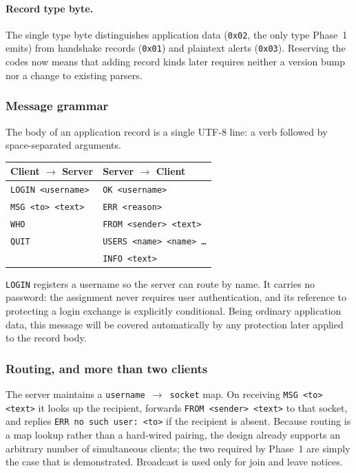 \documentclass[11pt,a4paper]{article}
\begin{document}
\paragraph{Record type byte.} The single type byte distinguishes application data (\texttt{0x02},
the only type Phase~1 emits) from handshake records (\texttt{0x01}) and plaintext alerts
(\texttt{0x03}). Reserving the codes now means that adding record kinds later requires neither a
version bump nor a change to existing parsers.

\subsubsection{Message grammar}

The body of an application record is a single UTF-8 line: a verb followed by space-separated
arguments.

\begin{center}
\small
\begin{tabular}{@{}ll@{}}
\toprule
\textbf{Client $\rightarrow$ Server} & \textbf{Server $\rightarrow$ Client} \\
\midrule
\texttt{LOGIN <username>} & \texttt{OK <username>} \\
\texttt{MSG <to> <text>}  & \texttt{ERR <reason>} \\
\texttt{WHO}              & \texttt{FROM <sender> <text>} \\
\texttt{QUIT}             & \texttt{USERS <name> <name> \dots} \\
                          & \texttt{INFO <text>} \\
\bottomrule
\end{tabular}
\end{center}

\texttt{LOGIN} registers a username so the server can route by name. It carries no password: the
assignment never requires user authentication, and its reference to protecting a login exchange is
explicitly conditional. Being ordinary application data, this message will be covered automatically by
any protection later applied to the record body.

\subsubsection{Routing, and more than two clients}

The server maintains a \texttt{username $\rightarrow$ socket} map. On receiving
\texttt{MSG <to> <text>} it looks up the recipient, forwards \texttt{FROM <sender> <text>} to that
socket, and replies \texttt{ERR no such user: <to>} if the recipient is absent. Because routing is a
map lookup rather than a hard-wired pairing, the design already supports an arbitrary number of
simultaneous clients; the two required by Phase~1 are simply the case that is demonstrated.
Broadcast is used only for join and leave notices.
\end{document}
